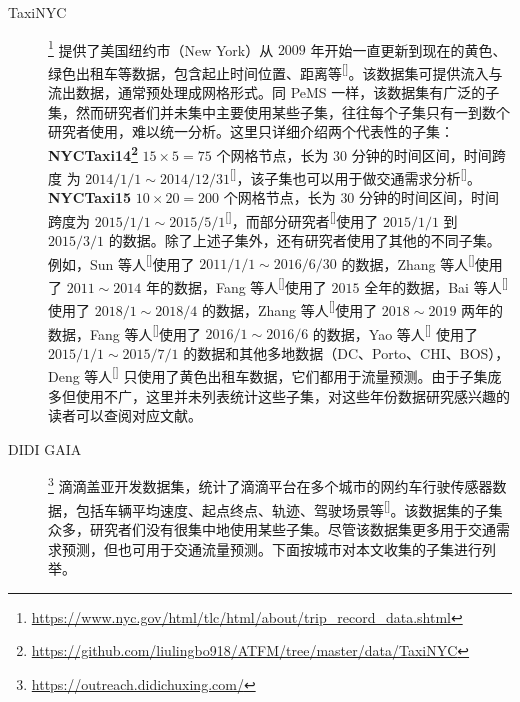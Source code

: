 \documentclass{ctexart}
\renewcommand{\cite}[1]{\textsuperscript{[\citenum{#1}]}}
\begin{document}
\begin{description}
    \item[TaxiNYC]\footnote{\url{https://www.nyc.gov/html/tlc/html/about/trip_record_data.shtml}} 提供了美国纽约市（New York）从 $2009$ 年开始一直更新到现在的黄色、绿色出租车等数据，包含起止时间位置、距离等\cite{T-ZS2}。该数据集可提供流入与流出数据，通常预处理成网格形式。同 PeMS 一样，该数据集有广泛的子集，然而研究者们并未集中主要使用某些子集，往往每个子集只有一到数个研究者使用，难以统一分析。这里只详细介绍两个代表性的子集：\textbf{NYCTaxi14\footnote{\url{https://github.com/liulingbo918/ATFM/tree/master/data/TaxiNYC}}} $15\times5=75$ 个网格节点，长为 $30$ 分钟的时间区间，时间跨度
    为 $2014/1/1\sim2014/12/31$\cite{T-ZS45}，该子集也可以用于做交通需求分析\cite{T-153}。\textbf{NYCTaxi15} $10\times20=200$ 个网格节点，长为 $30$ 分钟的时间区间，时间跨度为 $2015/1/1\sim2015/5/1$\cite{T-ZS45}，而部分研究者\cite{T-162, T-124}使用了 $2015/1/1$ 到 $2015/3/1$ 的数据。除了上述子集外，还有研究者使用了其他的不同子集。例如，Sun 等人\cite{T-203}使用了 $2011/1/1\sim2016/6/30$ 的数据，Zhang 等人\cite{T-204}使用了 $2011\sim2014$ 年的数据，Fang 等人\cite{T-274}使用了 $2015$ 全年的数据，Bai 等人\cite{T-218}使用了 $2018/1\sim2018/4$ 的数据，Zhang 等人\cite{T-291}使用了 $2018\sim2019$ 两年的数据，Fang 等人\cite{T-301}使用了 $2016/1\sim2016/6$ 的数据，Yao 等人\cite{T-328} 使用了 $2015/1/1\sim2015/7/1$ 的数据和其他多地数据（DC、Porto、CHI、BOS），Deng 等人\cite{T-354} 只使用了黄色出租车数据，它们都用于流量预测。由于子集庞多但使用不广，这里并未列表统计这些子集，对这些年份数据研究感兴趣的读者可以查阅对应文献。
    \item[DIDI GAIA]\footnote{\url{https://outreach.didichuxing.com/}} 滴滴盖亚开发数据集，统计了滴滴平台在多个城市的网约车行驶传感器数据，包括车辆平均速度、起点终点、轨迹、驾驶场景等\cite{T-ZS2}。该数据集的子集众多，研究者们没有很集中地使用某些子集。尽管该数据集更多用于交通需求预测，但也可用于交通流量预测。下面按城市对本文收集的子集进行列举。

\end{description}
\end{document}
